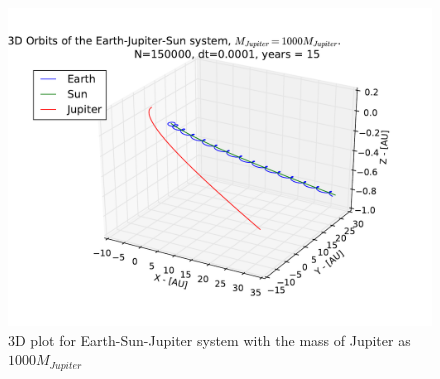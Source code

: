 \documentclass[12pt]{article}
\begin{document}
\begin{figure}[hbtp]
\centering
\includegraphics[width=\linewidth]{Plots/Earth_Sun_Jupiter_1000MJ_3D.pdf}
\caption{3D plot for Earth-Sun-Jupiter system with the mass of Jupiter as $1000M_{Jupiter}$}
\end{figure}
\end{document}
